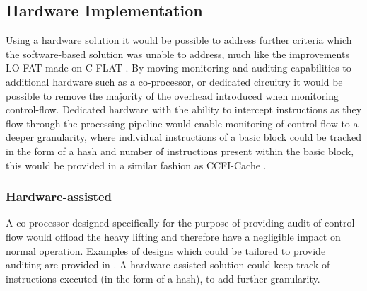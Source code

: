 \subsection{Hardware Implementation}
Using a hardware solution it would be possible to address further criteria which the software-based solution was unable to address, much like the improvements LO-FAT\cite{Dessouky2017} made on C-FLAT \cite{Abera2016}. By moving monitoring and auditing capabilities to additional hardware such as a co-processor, or dedicated circuitry it would be possible to remove the majority of the overhead introduced when monitoring control-flow. Dedicated hardware with the ability to intercept instructions as they flow through the processing pipeline would enable monitoring of control-flow to a deeper granularity, where individual instructions of a basic block could be tracked in the form of a hash and number of instructions present within the basic block, this would be provided in a similar fashion as CCFI-Cache \cite{Danger2018}.

\subsubsection*{Hardware-assisted}

A co-processor designed specifically for the purpose of providing audit of control-flow would offload the heavy lifting and therefore have a negligible impact on normal operation. Examples of designs which could be tailored to provide auditing are provided in \cite{DeClercq2017}. A hardware-assisted solution could keep track of instructions executed (in the form of a hash), to add further granularity.
